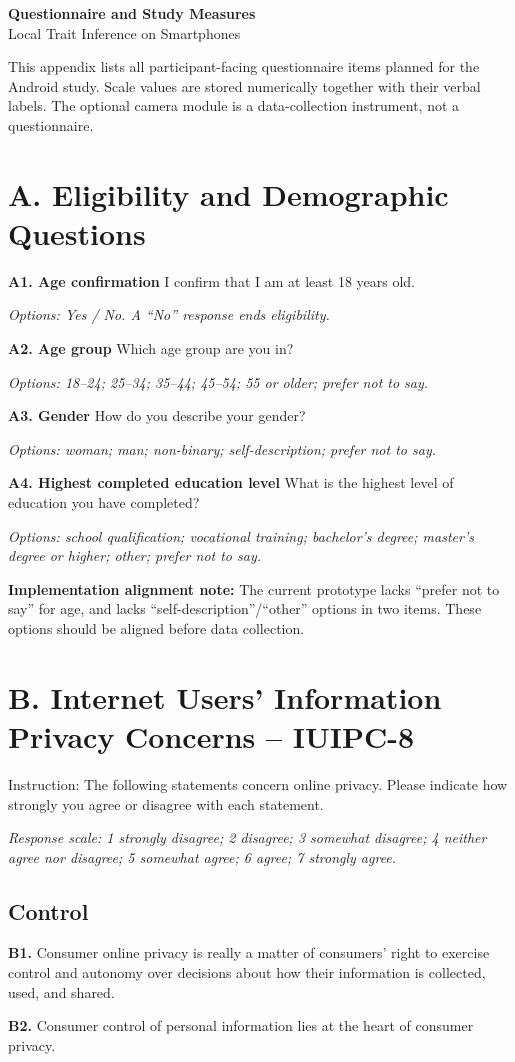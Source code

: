 \documentclass[10pt,a4paper]{article}
\newcommand{\scale}[1]{\textit{Response scale: #1}}
\newcommand{\qitem}[2]{\textbf{#1} #2\par}
\begin{document}
\begin{center}
  {\Large\bfseries Questionnaire and Study Measures}\\[0.3em]
  {\large Local Trait Inference on Smartphones}
\end{center}
\draftbanner

This appendix lists all participant-facing questionnaire items planned for the Android study. Scale values are stored numerically together with their verbal labels. The optional camera module is a data-collection instrument, not a questionnaire.

\section*{A. Eligibility and Demographic Questions}

\qitem{A1. Age confirmation}{I confirm that I am at least 18 years old.}
\textit{Options: Yes / No. A ``No'' response ends eligibility.}

\qitem{A2. Age group}{Which age group are you in?}
\textit{Options: 18--24; 25--34; 35--44; 45--54; 55 or older; prefer not to say.}

\qitem{A3. Gender}{How do you describe your gender?}
\textit{Options: woman; man; non-binary; self-description; prefer not to say.}

\qitem{A4. Highest completed education level}{What is the highest level of education you have completed?}
\textit{Options: school qualification; vocational training; bachelor's degree; master's degree or higher; other; prefer not to say.}

\textbf{Implementation alignment note:} The current prototype lacks ``prefer not to say'' for age, and lacks ``self-description''/``other'' options in two items. These options should be aligned before data collection.

\section*{B. Internet Users' Information Privacy Concerns -- IUIPC-8}

Instruction: The following statements concern online privacy. Please indicate how strongly you agree or disagree with each statement.

\scale{1 strongly disagree; 2 disagree; 3 somewhat disagree; 4 neither agree nor disagree; 5 somewhat agree; 6 agree; 7 strongly agree.}

\subsection*{Control}
\qitem{B1.}{Consumer online privacy is really a matter of consumers' right to exercise control and autonomy over decisions about how their information is collected, used, and shared.}
\qitem{B2.}{Consumer control of personal information lies at the heart of consumer privacy.}
\end{document}
